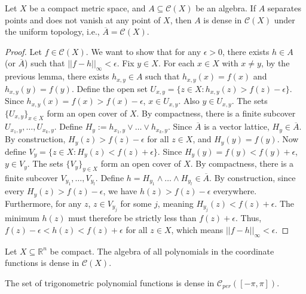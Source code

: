 \begin{theorem}
Let $X$ be a compact metric space, and $A \subseteq \mathcal{C}(X)$ be an algebra. If $A$ separates points and does not vanish at any point of $X$, then $A$ is dense in $\mathcal{C}(X)$ under the uniform topology, i.e., $\overline{A} = \mathcal{C}(X)$.
\end{theorem}
\begin{proof}
Let $f \in \mathcal{C}(X)$. We want to show that for any $\epsilon > 0$, there exists $h \in A$ (or $\overline{A}$) such that $||f - h||_\infty < \epsilon$.
Fix $y \in X$. For each $x \in X$ with $x \ne y$, by the previous lemma, there exists $h_{x,y} \in A$ such that $h_{x,y}(x) = f(x)$ and $h_{x,y}(y) = f(y)$.
Define the open set $U_{x,y} = \{z \in X : h_{x,y}(z) > f(z) - \epsilon\}$. Since $h_{x,y}(x) = f(x) > f(x) - \epsilon$, $x \in U_{x,y}$. Also $y \in U_{x,y}$.
The sets $\{U_{x,y}\}_{x \in X}$ form an open cover of $X$. By compactness, there is a finite subcover $U_{x_1,y}, \dots, U_{x_k,y}$.
Define $H_y := h_{x_1,y} \vee \dots \vee h_{x_k,y}$. Since $\overline{A}$ is a vector lattice, $H_y \in \overline{A}$. By construction, $H_y(z) > f(z) - \epsilon$ for all $z \in X$, and $H_y(y) = f(y)$.
Now define $V_y = \{z \in X : H_y(z) < f(z) + \epsilon\}$. Since $H_y(y) = f(y) < f(y) + \epsilon$, $y \in V_y$.
The sets $\{V_y\}_{y \in X}$ form an open cover of $X$. By compactness, there is a finite subcover $V_{y_1}, \dots, V_{y_l}$.
Define $h = H_{y_1} \wedge \dots \wedge H_{y_l} \in \overline{A}$.
By construction, since every $H_y(z) > f(z) - \epsilon$, we have $h(z) > f(z) - \epsilon$ everywhere. Furthermore, for any $z$, $z \in V_{y_j}$ for some $j$, meaning $H_{y_j}(z) < f(z) + \epsilon$. The minimum $h(z)$ must therefore be strictly less than $f(z) + \epsilon$.
Thus, $f(z) - \epsilon < h(z) < f(z) + \epsilon$ for all $z \in X$, which means $||f-h||_\infty < \epsilon$.
\end{proof}

\begin{corollary}
Let $X \subseteq \mathbb{R}^n$ be compact. The algebra of all polynomials in the coordinate functions is dense in $\mathcal{C}(X)$.
\end{corollary}

\begin{corollary}
The set of trigonometric polynomial functions is dense in $\mathcal{C}_{per}([-\pi, \pi])$.
\end{corollary}